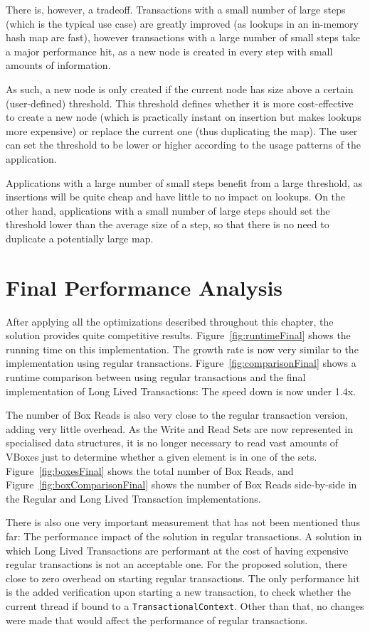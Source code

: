 There is, however, a tradeoff. Transactions with a small number of large
steps (which is the typical use case) are greatly improved (as lookups
in an in-memory hash map are fast), however transactions with a large
number of small steps take a major performance hit, as a new node is
created in every step with small amounts of information.

As such, a new node is only created if the current node has size above
a certain (user-defined) threshold. This threshold defines whether it
is more cost-effective to create a new node (which is practically
instant on insertion but makes lookups more expensive) or replace the
current one (thus duplicating the map). The user can set the threshold
to be lower or higher according to the usage patterns of the
application.

Applications with a large number of small steps benefit from a large
threshold, as insertions will be quite cheap and have little to no
impact on lookups. On the other hand, applications with a small number
of large steps should set the threshold lower than the average size of
a step, so that there is no need to duplicate a potentially large map.

\section{Final Performance Analysis}

After applying all the optimizations described throughout this
chapter, the solution provides quite competitive
results. Figure~\ref{fig:runtimeFinal} shows the running time on this
implementation. The growth rate is now very similar to the
implementation using regular
transactions. Figure~\ref{fig:comparisonFinal} shows a runtime
comparison between using regular transactions and the final
implementation of Long Lived Transactions: The speed down is now under
1.4x.

The number of Box Reads is also very close to the regular transaction
version, adding very little overhead. As the Write and Read Sets are
now represented in specialised data structures, it is no longer
necessary to read vast amounts of VBoxes just to determine whether a
given element is in one of the sets. Figure~\ref{fig:boxesFinal} shows
the total number of Box Reads, and Figure~\ref{fig:boxComparisonFinal}
shows the number of Box Reads side-by-side in the Regular and Long
Lived Transaction implementations.

There is also one very important measurement that has not been
mentioned thus far: The performance impact of the solution in regular
transactions. A solution in which Long Lived Transactions are
performant at the cost of having expensive regular transactions is not
an acceptable one. For the proposed solution, there close to zero
overhead on starting regular transactions. The only performance hit is the
added verification upon starting a new transaction, to check whether
the current thread if bound to a \texttt{TransactionalContext}. Other
than that, no changes were made that would affect the performance of
regular transactions.

